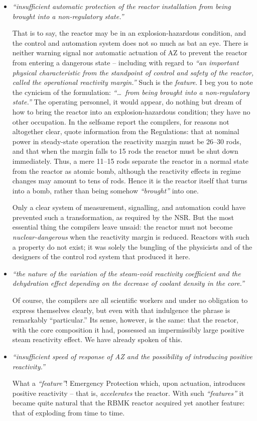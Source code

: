 \documentclass[openright]{bookest}
\begin{document}
\begin{itemize}
\item \textit{``insufficient automatic protection of the reactor installation from being brought into a non-regulatory state.''}

That is to say, the reactor may be in an explosion-hazardous condition, and the control and automation system does not so much as bat an eye. There is neither warning signal nor automatic actuation of AZ to prevent the reactor from entering a dangerous state -- including with regard to \textit{``an important physical characteristic from the standpoint of control and safety of the reactor, called the operational reactivity margin.''} Such is the \textit{feature}. I beg you to note the cynicism of the formulation: \textit{``\ldots~from being brought into a non-regulatory state.''} The operating personnel, it would appear, do nothing but dream of how to bring the reactor into an explosion-hazardous condition; they have no other occupation. In the selfsame report the compilers, for reasons not altogether clear, quote information from the Regulations: that at nominal power in steady-state operation the reactivity margin must be \numrange{26}{30} rods, and that when the margin falls to \num{15} rods the reactor must be shut down immediately. Thus, a mere \numrange{11}{15} rods separate the reactor in a normal state from the reactor as atomic bomb, although the reactivity effects in regime changes may amount to tens of rods. Hence it is the reactor itself that turns into a bomb, rather than being somehow \textit{``brought''} into one.

Only a clear system of measurement, signalling, and automation could have prevented such a transformation, as required by the NSR. But the most essential thing the compilers leave unsaid: the reactor must not become \textit{nuclear-dangerous} when the reactivity margin is reduced. Reactors with such a property do not exist; it was solely the bungling of the physicists and of the designers of the control rod system that produced it here.

\item \textit{``the nature of the variation of the steam-void reactivity coefficient and the dehydration effect depending on the decrease of coolant density in the core.''}

Of course, the compilers are all scientific workers and under no obligation to express themselves clearly, but even with that indulgence the phrase is remarkably ``particular.'' Its sense, however, is the same: that the reactor, with the core composition it had, possessed an impermissibly large positive steam reactivity effect. We have already spoken of this.

\item \textit{``insufficient speed of response of AZ and the possibility of introducing positive reactivity.''}

What a \textit{``feature''}! Emergency Protection which, upon actuation, introduces positive reactivity -- that is, \textit{accelerates} the reactor. With such \textit{``features''} it became quite natural that the RBMK reactor acquired yet another feature: that of exploding from time to time.
\end{itemize}
\end{document}

